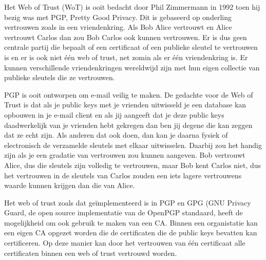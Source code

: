 Het Web of Trust (WoT) is ooit bedacht door Phil Zimmermann in 1992 toen hij bezig was met PGP, Pretty Good Privacy. Dit is gebaseerd op onderling vertrouwen zoals in een vriendenkring. Als Bob Alice vertrouwt en Alice vertrouwt Carlos dan zou Bob Carlos ook kunnen vertrouwen. Er is dus geen centrale partij die bepaalt of een certificaat of een publieke sleutel te vertrouwen is en er is ook niet \'e\'en web of trust, net zomin als er \'e\'en vriendenkring is. Er kunnen verschillende vriendenkringen wereldwijd zijn met hun eigen collectie van publieke sleutels die ze vertrouwen.

PGP is ooit ontworpen om e-mail veilig te maken. De gedachte voor de Web of Trust is dat als je public keys met je vrienden uitwisseld je een database kan opbouwen in je e-mail client en als jij aangeeft dat je deze public keys daadwerkelijk van je vrienden hebt gekregen dan ben jij degene die kan zeggen dat ze echt zijn. Als anderen dat ook doen, dan kan je daarna fysiek of electronisch de verzamelde sleutels met elkaar uitwisselen. Daarbij zou het handig zijn als je een gradatie van vertrouwen zou kunnen aangeven. Bob vertrouwt Alice, dus die sleutels zijn volledig te vertrouwen, maar Bob kent Carlos niet, dus het vertrouwen in de sleutels van Carlos zouden een iets lagere vertrouwens waarde kunnen krijgen dan die van Alice.

Het web of trust zoals dat ge\"implementeerd is in PGP en GPG (GNU Privacy Guard, de open source implementatie van de OpenPGP standaard, heeft de mogelijkheid om ook gebruik te maken van een CA. Binnen een organistatie kan een eigen CA opgezet worden die de certificaten die de public keys bevatten kan certificeren. Op deze manier kan door het vertrouwen van \'e\'en certificaat alle certificaten binnen een web of trust vertrouwd worden.
